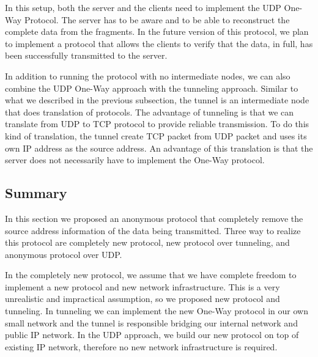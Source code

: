 In this setup, both the server and the clients need to implement the UDP One-Way
Protocol. The server has to be aware and to be able to reconstruct the complete
data from the fragments. In the future version of this protocol, we plan to
implement a protocol that allows the clients to verify that the data, in full,
has been successfully transmitted to the server.

In addition to running the protocol with no intermediate nodes, we can also combine
the UDP One-Way approach with the tunneling approach. Similar to what we described
in the previous subsection, the tunnel is an intermediate node that does translation
of protocols. The advantage of tunneling is that we can translate from UDP to TCP
protocol to provide reliable transmission. To do this kind of translation, the
tunnel create TCP packet from UDP packet and uses its own IP address as the source
address. An advantage of this translation is that the server does not necessarily
have to implement the One-Way protocol.

\subsection{Summary}
In this section we proposed an anonymous protocol that completely remove the source
address information of the data being transmitted. Three way to realize this protocol
are completely new protocol, new protocol over tunneling, and anonymous protocol
over UDP.

In the completely new protocol, we assume that we have complete freedom to implement
a new protocol and new network infrastructure. This is a very unrealistic and
impractical assumption, so we proposed new protocol and tunneling. In tunneling
we can implement the new One-Way protocol in our own small network and the tunnel
is responsible bridging our internal network and public IP network. In the UDP
approach, we build our new protocol on top of existing IP network, therefore
no new network infrastructure is required.

